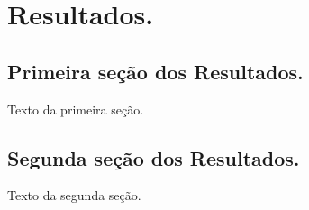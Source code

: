 \chapter{Resultados.}


\section{Primeira seção dos Resultados.}

Texto da primeira seção.

\section{Segunda seção dos Resultados.}

Texto da segunda seção.
